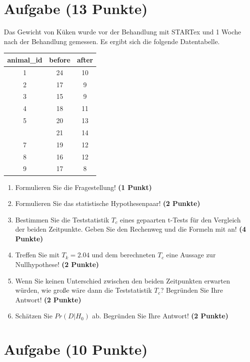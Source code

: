 \documentclass[a4paper, 10pt]{scrartcl}\usepackage[]{graphicx}\usepackage[]{xcolor}
\begin{document}
\section{Aufgabe \hfill (13 Punkte)}

Das Gewicht von K{\"u}ken wurde vor der Behandlung mit STARTex und 1 Woche nach
der Behandlung gemessen. Es ergibt sich die folgende Datentabelle.

\begin{table}[!h]
\centering
\begin{tabular}{ccc}
\toprule
animal\_id & before & after\\
\midrule
1 & 24 & 10\\
2 & 17 & 9\\
3 & 15 & 9\\
4 & 18 & 11\\
5 & 20 & 13\\
\addlinespace
6 & 21 & 14\\
7 & 19 & 12\\
8 & 16 & 12\\
9 & 17 & 8\\
\bottomrule
\end{tabular}
\end{table}



\begin{enumerate}
\item Formulieren Sie die Fragestellung! \textbf{(1 Punkt)}
\item Formulieren Sie das statistische Hypothesenpaar! \textbf{(2
    Punkte)}
\item Bestimmen Sie die Teststatistik $T_c$ eines gepaarten t-Tests f{\"u}r den
  Vergleich der beiden Zeitpunkte. Geben Sie den Rechenweg und die Formeln
  mit an! \textbf{(4 Punkte)}
\item Treffen Sie mit $T_k = 2.04$ und dem berechneten $T_c$ eine Aussage
  zur Nullhypothese! \textbf{(2 Punkte)}
\item Wenn Sie keinen Unterschied zwischen den beiden Zeitpunkten erwarten
  w{\"u}rden, wie gro{\ss}e w{\"a}re dann die Teststatistik $T_c$? Begr{\"u}nden Sie Ihre
  Antwort! \textbf{(2 Punkte)}
\item Sch{\"a}tzen Sie $Pr(D|H_0)$ ab. Begr{\"u}nden Sie Ihre Antwort! \textbf{(2
    Punkte)}
\end{enumerate} 
\clearpage

\section{Aufgabe \hfill (10 Punkte)}
\end{document}
